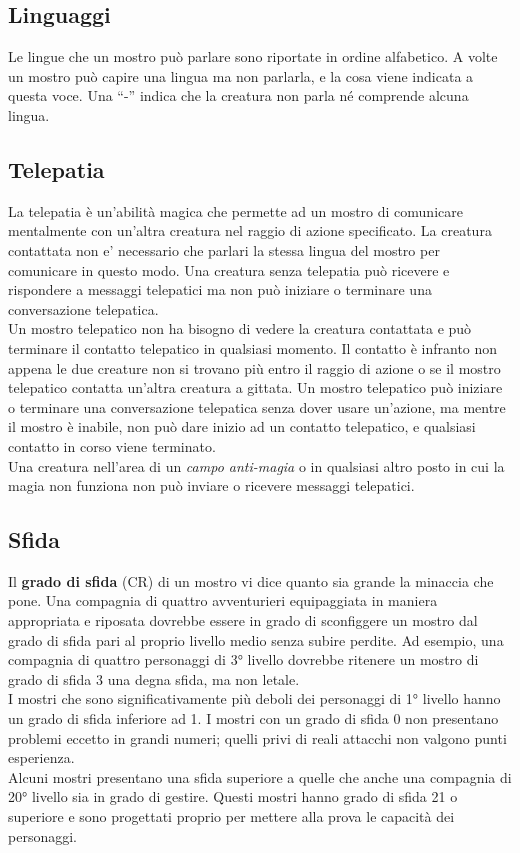 \subsection{Linguaggi}

Le lingue che un mostro può parlare sono riportate in ordine alfabetico. A volte un mostro può capire una lingua ma non parlarla, e la cosa viene indicata a questa voce. Una ``-'' indica che la creatura non parla né comprende alcuna lingua.

\subsection{Telepatia}

La telepatia è un'abilità magica che permette ad un mostro di comunicare mentalmente con un'altra creatura nel raggio di azione specificato. La creatura contattata non e' necessario che parlari la stessa lingua del mostro per comunicare in questo modo. Una creatura senza telepatia può ricevere e rispondere a messaggi telepatici ma non può iniziare o terminare una conversazione telepatica.\\
Un mostro telepatico non ha bisogno di vedere la creatura contattata e può terminare il contatto telepatico in qualsiasi momento. Il contatto è infranto non appena le due creature non si trovano più entro il raggio di azione o se il mostro telepatico contatta un'altra creatura a gittata. Un mostro telepatico può iniziare o terminare una conversazione  telepatica senza dover usare un'azione, ma mentre il mostro è inabile, non può dare inizio ad un contatto telepatico, e qualsiasi contatto in corso viene terminato.\\
Una creatura nell'area di un \emph{campo anti-magia} o in qualsiasi altro posto in cui la magia non funziona non può inviare o ricevere messaggi telepatici.

\subsection{Sfida}

Il \textbf{grado di sfida} (CR) di un mostro vi dice quanto sia grande la minaccia che pone. Una compagnia di quattro avventurieri equipaggiata in maniera appropriata e riposata dovrebbe essere in grado di sconfiggere un mostro dal grado di sfida pari al proprio livello medio senza subire perdite. Ad esempio, una compagnia di quattro personaggi di 3° livello dovrebbe ritenere un mostro di grado di sfida 3 una degna sfida, ma non letale.\\
I mostri che sono significativamente più deboli dei personaggi di 1° livello hanno un grado di sfida inferiore ad 1. I mostri con un grado di sfida 0 non presentano problemi eccetto in grandi numeri; quelli privi di reali attacchi non valgono punti esperienza.\\
Alcuni mostri presentano una sfida superiore a quelle che anche una compagnia di 20° livello sia in grado di gestire. Questi mostri hanno grado di sfida 21 o superiore e sono progettati proprio per mettere alla prova le capacità dei personaggi.\\

